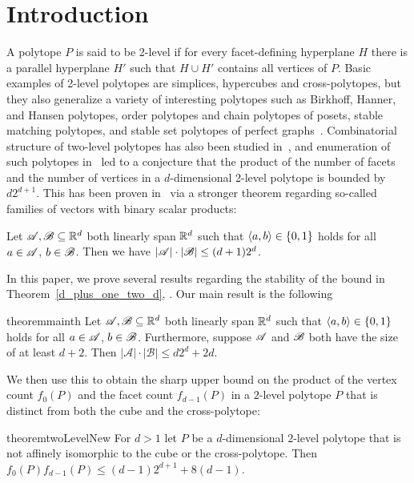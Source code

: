 \section{Introduction}

A polytope $P$ is said to be 2-level if for every facet-defining hyperplane $H$ there is a parallel hyperplane $H'$ such that $H \cup H'$ contains all vertices of $P$. Basic examples of 2-level polytopes are simplices, hypercubes and cross-polytopes, but they also generalize a variety of interesting polytopes such as Birkhoff, Hanner, and Hansen polytopes, order polytopes and chain polytopes of posets, stable matching polytopes, and stable set polytopes of perfect graphs~\cite{aprile18}. Combinatorial structure of two-level polytopes has also been studied in~\cite{fiorini16}, and enumeration of such polytopes in~\cite{bohn18} led to a conjecture that the product of the number of facets and the number of vertices in a $d$-dimensional 2-level polytope is bounded by $d 2^{d+1}$. This has been proven in~\cite{kupavskii22} via a stronger theorem regarding so-called families of vectors with binary scalar products:
\begin{theorem}
    \label{d_plus_one_two_d}
    Let ${\mathscr{A}},{\mathscr{B}} \subseteq {\mathbb{R}}^d$ both linearly span ${\mathbb{R}}^d$ such that $\langle a, b\rangle \in \{0,1\}$ holds for all $a \in {\mathscr{A}}$, $b \in {\mathscr{B}}$.
    Then we have $|{\mathscr{A}}| \cdot |{\mathscr{B}}| \le (d+1) 2^d$.
\end{theorem}

\noindent In this paper, we prove several results regarding the stability of the bound in Theorem~\ref{d_plus_one_two_d}, . Our main result is the following

\begin{restatable}[]{theorem}{mainth}\label{d2d_plus_2d}
     Let ${\mathscr{A}},{\mathscr{B}} \subseteq {\mathbb{R}}^d$ both linearly span ${\mathbb{R}}^d$ such that $\langle a, b\rangle \in \{0,1\}$ holds for all $a \in {\mathscr{A}}$, $b \in {\mathscr{B}}$. Furthermore, suppose ${\mathscr{A}}$ and ${\mathscr{B}}$ both have the size of at least $d+2$. Then $\left|\mathcal{A}\right| \cdot\left|\mathcal{B}\right| \leq d 2^d + 2d$.
\end{restatable}

\noindent We then use this to obtain the sharp upper bound on the product of the vertex count $f_0(P)$ and the facet count $f_{d-1}(P)$ in a $2$-level polytope $P$ that is distinct from both the cube and the cross-polytope:

\begin{restatable}{theorem}{twoLevelNew}
    \label{two_level_new_bound}
    For $d>1$ let $P$ be a $d$-dimensional $2$-level polytope that is not affinely isomorphic to the cube or the cross-polytope. Then $f_0(P) f_{d-1}(P) \leq \left(d-1\right) 2^{d+1} + 8\left(d-1\right)$.
\end{restatable}


